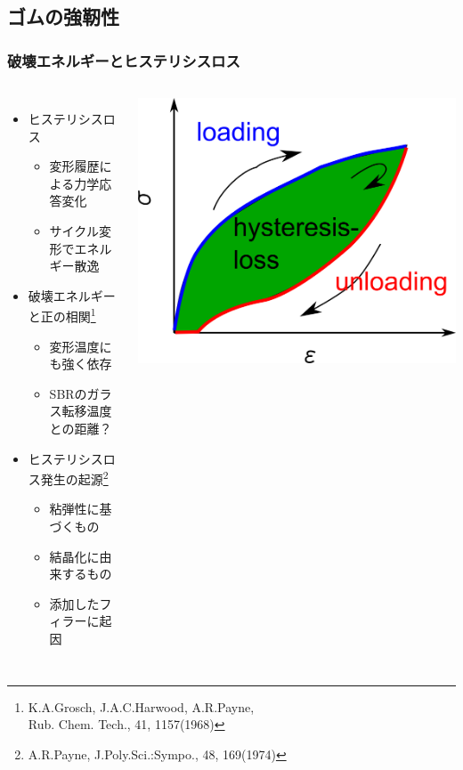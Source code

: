 \documentclass[12pt, dvipdfmx]{beamer}
\begin{document}
\subsection{ゴムの強靭性}
\begin{frame}
	\frametitle{破壊エネルギーとヒステリシスロス}
	\vspace{-1mm}
			\begin{columns}[T, onlytextwidth]
					\begin{itemize}
						\item ヒステリシスロス
							\begin{itemize}
								\item 変形履歴による力学応答変化
								\item サイクル変形でエネルギー散逸
							\end{itemize}
						\item 破壊エネルギーと\alert{正の相関}\footnote{
								\scriptsize{K.A.Grosch, J.A.C.Harwood, A.R.Payne, \\Rub. Chem. Tech., 41, 1157(1968)}
							}
							\begin{itemize}
								\item \alert{変形温度}にも強く依存
								\item SBRのガラス転移温度との距離？
							\end{itemize}
						\item ヒステリシスロス発生の起源\footnote{
							\scriptsize{A.R.Payne, J.Poly.Sci.:Sympo., 48, 169(1974)}
						}
						\begin{itemize}
							\item \alert{粘弾性に基づくもの}
							\color{blue}
							\item 結晶化に由来するもの
							\item 添加したフィラーに起因
						\end{itemize}
					\end{itemize}
				\begin{center}
					\vspace{-2mm}
					\includegraphics[width=\textwidth]{hysteresis_curve.png}


\end{center}
\end{columns}
\end{frame}
\end{document}
